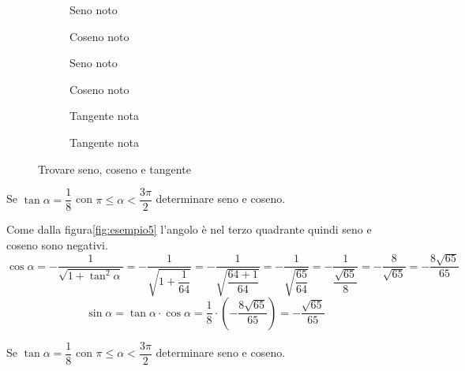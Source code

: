 \begin{figure}
\begin{subfigure}[b]{.5\linewidth}
\centering

\captionsetup{format=esempio}
\caption{Seno noto}\label{fig:esempio1}
\end{subfigure}%
\begin{subfigure}[b]{.5\linewidth}
\centering

\captionsetup{format=esempio}
\caption{Coseno noto}\label{fig:esempio2}
\end{subfigure}%
\quad
\begin{subfigure}[b]{.5\linewidth}
\centering

\captionsetup{format=esempio}
\caption{Seno noto}\label{fig:esempio3}
\end{subfigure}%
\begin{subfigure}[b]{.5\linewidth}
\centering

\captionsetup{format=esempio}
\caption{Coseno noto}\label{fig:esempio4}
\end{subfigure}%
\quad
\begin{subfigure}[b]{.5\linewidth}
	\centering
	
	\caption{Tangente nota}\label{fig:esempio5}
\end{subfigure}%
\begin{subfigure}[b]{.5\linewidth}
	\centering
	
	\caption{Tangente nota}\label{fig:esempio6}
\end{subfigure}%
\caption{Trovare seno, coseno e tangente}
\end{figure}
\begin{esempiot}{}{}
Se $\tan\alpha=\dfrac{1}{8}$ con $\pi\leq\alpha<\dfrac{3\pi}{2}$ determinare seno e coseno.
\end{esempiot}
Come dalla figura\nobs\vref{fig:esempio5} l'angolo è nel terzo quadrante quindi seno e coseno sono negativi.
\[\cos\alpha=-\dfrac{1}{\sqrt{1+\tan^2\alpha}}=-\dfrac{1}{\sqrt{1+\dfrac{1}{64}}}=-\dfrac{1}{\sqrt{\dfrac{64+1}{64}}}=-\dfrac{1}{\sqrt{\dfrac{65}{64}}}=-\dfrac{1}{\dfrac{\sqrt{65}}{8}}=-\dfrac{8}{\sqrt{65}}=-\dfrac{8\sqrt{65}}{65} \]
\[\sin\alpha=\tan\alpha\cdot\cos\alpha=\dfrac{1}{8}\cdot\left(-\dfrac{8\sqrt{65}}{65}\right)=-\dfrac{\sqrt{65}}{65} \]
\begin{esempiot}{}{}
	Se $\tan\alpha=\dfrac{1}{8}$ con $\pi\leq\alpha<\dfrac{3\pi}{2}$ determinare seno e coseno.
\end{esempiot}
